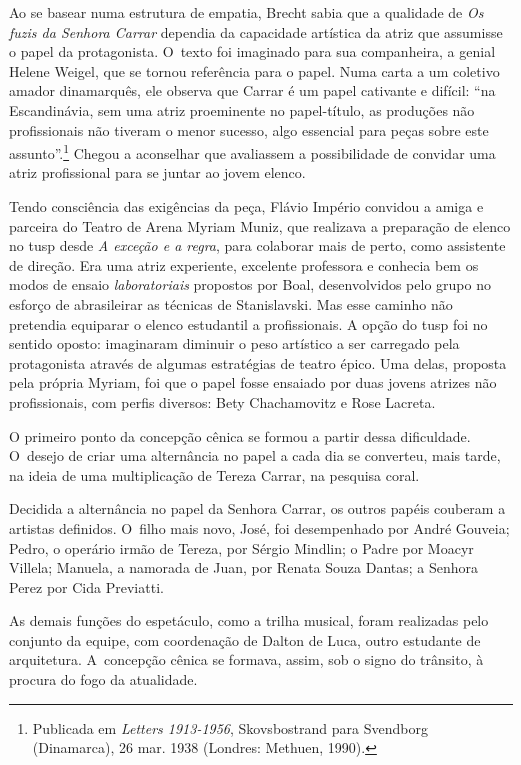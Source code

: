 Ao se basear numa estrutura de empatia, Brecht sabia que a qualidade de
{\it Os fuzis da Senhora Carrar} dependia da capacidade artística da
atriz que assumisse o papel da protagonista. O~texto foi imaginado para
sua companheira, a genial Helene Weigel, que se tornou referência para o
papel. Numa carta a um coletivo amador dinamarquês, ele observa que
Carrar é um papel cativante e difícil: “na Escandinávia, sem uma atriz
proeminente no papel-título, as produções não profissionais não tiveram
o menor sucesso, algo essencial para peças sobre este
assunto”.\footnote{Publicada em {\it Letters 1913-1956}, Skovsbostrand
  para Svendborg (Dinamarca), 26 mar. 1938 (Londres: Methuen, 1990).}
Chegou a aconselhar que avaliassem a possibilidade de convidar uma atriz
profissional para se juntar ao jovem elenco.

Tendo consciência das exigências da peça, Flávio Império convidou a
amiga e parceira do Teatro de Arena Myriam Muniz, que realizava a
preparação de elenco no {\sc tusp} desde {\it A exceção e a regra}, para
colaborar mais de perto, como assistente de direção. Era uma atriz
experiente, excelente professora e conhecia bem os modos de ensaio
{\it laboratoriais} propostos por Boal, desenvolvidos pelo grupo no
esforço de abrasileirar as técnicas de Stanislavski. Mas esse
caminho não pretendia equiparar o elenco estudantil a profissionais. A
opção do {\sc tusp} foi no sentido oposto: imaginaram diminuir o peso
artístico a ser carregado pela protagonista através de algumas
estratégias de teatro épico. Uma delas, proposta pela própria Myriam,
foi que o papel fosse ensaiado por duas jovens atrizes
não profissionais, com perfis diversos: Bety Chachamovitz e Rose
Lacreta.

O primeiro ponto da concepção cênica se formou a partir dessa
dificuldade. O~desejo de criar uma alternância no papel a cada dia se
converteu, mais tarde, na ideia de uma multiplicação de Tereza Carrar,
na pesquisa coral.

Decidida a alternância no papel da Senhora Carrar, os outros papéis
couberam a artistas definidos. O~filho mais novo, José, foi desempenhado
por André Gouveia; Pedro, o operário irmão de Tereza, por Sérgio
Mindlin; o Padre por Moacyr Villela; Manuela, a namorada de Juan, por
Renata Souza Dantas; a Senhora Perez por Cida Previatti.

As demais funções do espetáculo, como a trilha musical, foram realizadas
pelo conjunto da equipe, com coordenação de Dalton de Luca, outro
estudante de arquitetura. A~concepção cênica se formava, assim, sob o
signo do trânsito, à procura do fogo da atualidade.

